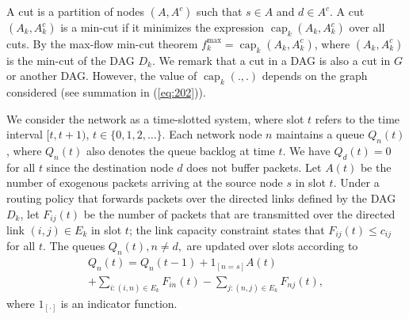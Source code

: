 \documentclass{sig-alternate-2013}
\newcommand{\capp}{\operatorname{cap}}
\begin{document}
A cut 
is 
a partition of nodes $(A,A^c)$ such that $s \in A$ and $d \in A^c$. A cut $(A_k,A_k^{c})$ is 
a min-cut if 
it minimizes the expression $\capp_k(A_k,A_k^{c}) $ over all cuts. 
By the max-flow min-cut theorem $f^{\max}_k = \capp_k(A_k,A_k^{c})$, where $(A_k,A_k^{c})$ is the min-cut of the DAG $D_k$.
We remark that a cut in a DAG is also a cut in $G$ or another DAG.
However, the value of $\capp_k(.,.)$ depends on the graph considered (see summation in (\ref{eq:202})).


We consider the network as a time-slotted system, where slot $t$ refers to the time interval $[t, t+1)$, $t\in\{0, 1, 2, \ldots\}$. Each network node $n$ maintains a queue $Q_{n}(t)$, where $Q_{n}(t)$ also denotes the queue backlog at time $t$. We have $Q_{d}(t)=0$ for all $t$ since the destination node $d$ does not buffer packets. Let $A(t)$ be the number of exogenous packets arriving at the source node $s$ in slot $t$. Under a routing policy that forwards packets over the directed links defined by the DAG $D_{k}$, let $F_{ij}(t)$ be the number of packets that are transmitted over the directed link $(i, j) \in E_{k}$ in slot $t$; the link capacity constraint states that $F_{ij}(t)\leq c_{ij}$ for all $t$. The queues $Q_{n}(t), n\ne d,$ are updated over slots according to
\begin{multline} \label{eq:101}
Q_n(t) = Q_{n}(t-1) + 1_{[n=s]} A(t) \\
+ \sum_{i:(i,n) \in E_{k} } F_{in}(t) - \sum_{j:(n,j) \in E_{k} } F_{nj}(t),
\end{multline}
where $1_{[\cdot]}$ is an indicator function. 
\end{document}
